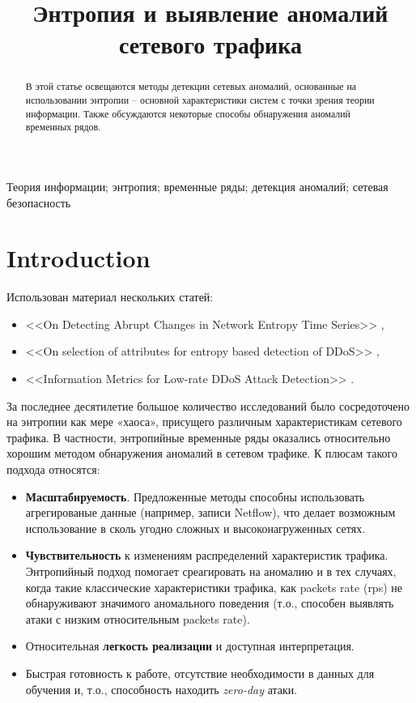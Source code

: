\documentclass[]{interact}
\theoremstyle{plain}%
\theoremstyle{definition}
\theoremstyle{remark}
\begin{document}

\title{Энтропия и выявление аномалий сетевого трафика}

\author{
}

\maketitle

\begin{abstract}
В этой статье освещаются методы детекции сетевых аномалий, основанные на использовании энтропии -- основной характеристики систем с точки зрения теории информации. Также обсуждаются некоторые способы обнаружения аномалий временных рядов.
\end{abstract}

\begin{keywords}
Теория информации; энтропия; временные ряды; детекция аномалий; сетевая безопасность
\end{keywords}


\section{Introduction}

Использован материал нескольких статей:
\begin{itemize}
    \item <<On Detecting Abrupt Changes in Network Entropy Time Series>> \cite{Win11},
    \item <<On selection of attributes for entropy based detection of DDoS>> \cite{Sah15},
    \item <<Information Metrics for Low-rate DDoS Attack Detection>> \cite{Bhu14}.
\end{itemize}

За последнее десятилетие большое количество исследований было сосредоточено на энтропии как мере «хаоса», присущего различным характеристикам сетевого трафика. В частности, энтропийные временные ряды оказались относительно хорошим методом обнаружения аномалий в сетевом трафике. К плюсам такого подхода относятся:
\begin{itemize}
    \item \textbf{Масштабируемость}. Предложенные методы способны использовать агрегированые данные (например, записи Netflow), что делает возможным использование в сколь угодно сложных и высоконагруженных сетях.
    \item \textbf{Чувствительность} к изменениям распределений характеристик трафика. Энтропийный подход помогает среагировать на аномалию и в тех случаях, когда такие классические характеристики трафика, как packets rate (rps) не обнаруживают значимого аномального поведения (т.о., способен выявлять атаки с низким относительным packets rate).
    \item Относительная \textbf{легкость реализации} и доступная интерпретация.
    \item Быстрая готовность к работе, отсутствие необходимости в данных для обучения и, т.о., способность находить \textit{zero-day} атаки.
\end{itemize}
\end{document}
